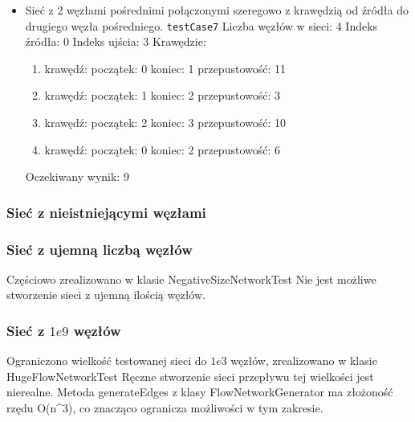\begin{itemize}[nosep]
    \item Sieć z 2 węzłami pośrednimi połączonymi szeregowo z krawędzią od
    źródła do drugiego węzła pośredniego.
    \texttt{testCase7}
    Liczba węzłów w sieci: 4
    Indeks źródła: 0
    Indeks ujścia: 3
    Krawędzie:
    \begin{enumerate}[nosep]
        \item krawędź:
        początek: 0
        koniec: 1
        przepustowość: 11
        \item krawędź:
        początek: 1
        koniec: 2
        przepustowość: 3
        \item krawędź:
        początek: 2
        koniec: 3
        przepustowość: 10
        \item krawędź:
        początek: 0
        koniec: 2
        przepustowość: 6
    \end{enumerate}
    Oczekiwany wynik: 9

\end{itemize}


\subsubsection{Sieć z nieistniejącymi węzłami}


\subsubsection{Sieć z ujemną liczbą węzłów}
Częściowo zrealizowano w klasie NegativeSizeNetworkTest Nie jest możliwe
stworzenie sieci z ujemną ilością węzłów.

\subsubsection{Sieć z $1e9$ węzłów}
Ograniczono wielkość testowanej sieci do $1e3$ węzłów, zrealizowano w klasie
HugeFlowNetworkTest Ręczne stworzenie sieci przepływu tej wielkości jest
nierealne. Metoda generateEdges z klasy FlowNetworkGenerator ma złożoność
rzędu O(n^3), co znacząco ogranicza możliwości w tym zakresie.

